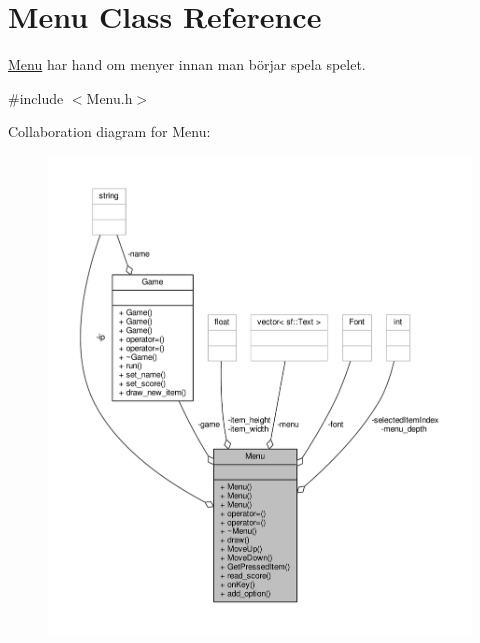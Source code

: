 \hypertarget{classMenu}{\section{Menu Class Reference}
\label{classMenu}
}


\hyperlink{classMenu}{Menu} har hand om menyer innan man börjar spela spelet.  




{\ttfamily \#include $<$Menu.\+h$>$}



Collaboration diagram for Menu\+:\nopagebreak
\begin{figure}[H]
\begin{center}
\leavevmode
\includegraphics[width=350pt]{classMenu__coll__graph}
\end{center}
\end{figure}
